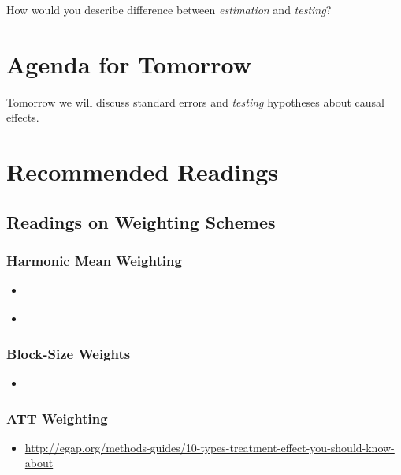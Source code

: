 \documentclass[11pt,leqno]{article}\usepackage[]{graphicx}\usepackage[]{color}
\theoremstyle{newstyle}
\begin{document}
How would you describe difference between \textit{estimation} and \textit{testing}?

\section{Agenda for Tomorrow}

Tomorrow we will discuss standard errors and \textit{testing} hypotheses about causal effects.

\section{Recommended Readings}

\subsection{Readings on Weighting Schemes}

\subsubsection{Harmonic Mean Weighting}

\begin{itemize}

\item \citet[Section 9.3.3]{hansen2011}

\item \citet[Section 2.1]{hansenbowers2008}

\end{itemize}

\subsubsection{Block-Size Weights}

\begin{itemize}

\item \citet[Section 3.6.1]{gerbergreen2012}

\end{itemize}

\subsubsection{ATT Weighting}

\begin{itemize}

\item
	\url{http://egap.org/methods-guides/10-types-treatment-effect-you-should-know-about}

\end{itemize}
\end{document}
